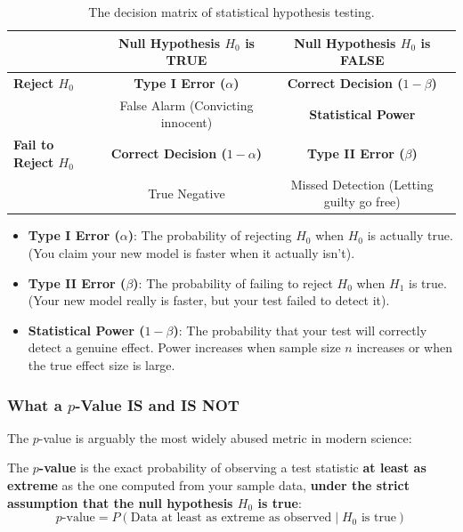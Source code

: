 \begin{table}[htbp]
\centering
\caption{The decision matrix of statistical hypothesis testing.}\label{tab:error_quadrant}
\small
\begin{tabular}{lcc}
\toprule
& \textbf{Null Hypothesis $H_0$ is TRUE} & \textbf{Null Hypothesis $H_0$ is FALSE} \\
\midrule
\textbf{Reject $H_0$} & \textbf{Type I Error ($\alpha$)} & \textbf{Correct Decision ($1 - \beta$)} \\
& False Alarm (Convicting innocent) & \textbf{Statistical Power} \\
\midrule
\textbf{Fail to Reject $H_0$} & \textbf{Correct Decision ($1 - \alpha$)} & \textbf{Type II Error ($\beta$)} \\
& True Negative & Missed Detection (Letting guilty go free) \\
\bottomrule
\end{tabular}
\end{table}

\begin{itemize}
    \item \textbf{Type I Error ($\alpha$)}: The probability of rejecting $H_0$ when $H_0$ is actually true. (You claim your new model is faster when it actually isn't).
    \item \textbf{Type II Error ($\beta$)}: The probability of failing to reject $H_0$ when $H_1$ is true. (Your new model really is faster, but your test failed to detect it).
    \item \textbf{Statistical Power ($1 - \beta$)}: The probability that your test will correctly detect a genuine effect. Power increases when sample size $n$ increases or when the true effect size is large.
\end{itemize}

\subsubsection{What a $p$-Value IS and IS NOT}
The $p$-value is arguably the most widely abused metric in modern science:

\begin{keyidea}
The \textbf{$p$-value} is the exact probability of observing a test statistic \textbf{at least as extreme} as the one computed from your sample data, \textbf{under the strict assumption that the null hypothesis $H_0$ is true}:
\begin{equation}
p\text{-value} = P(\text{Data at least as extreme as observed} \mid H_0 \text{ is true})\label{eq:p_val_def}
\end{equation}
\end{keyidea}

